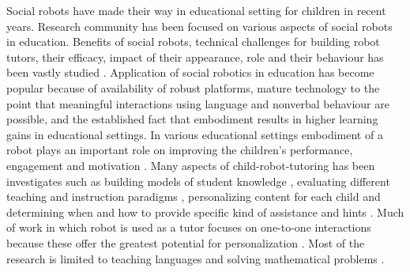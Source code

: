 Social robots have made their way in educational setting for children in recent years. Research community has been focused on various aspects of social robots in education. Benefits of social robots, technical challenges for building robot tutors, their efficacy, impact of their appearance, role and their behaviour has been vastly studied \parencite{belpaeme2018social}. Application of social robotics in education has become popular because of availability of robust platforms, mature technology to the point that meaningful interactions using language and nonverbal behaviour are possible, and the established fact that embodiment results in higher learning gains in educational settings. In various educational settings embodiment of a robot plays an important role on improving the children's performance, engagement and motivation \parencite{kose2015effect} \parencite{kennedy2015comparing}. Many aspects of child-robot-tutoring has been investigates such as building models of student knowledge \parencite{spaulding2016affect}, evaluating different teaching and instruction paradigms \parencite{hood2015children}, personalizing content for each child \parencite{gordon2016affective} and determining when and how to provide specific kind of assistance and hints \parencite{ramachandran2016shaping}. Much of work in which robot is used as a tutor focuses on one-to-one interactions because these offer the greatest potential for personalization \parencite{belpaeme2018social} \parencite{ramachandran2019personalized}. Most of the research is limited to teaching languages \parencite{gordon2016affective} and solving mathematical problems \parencite{ramachandran2019personalized}. 


